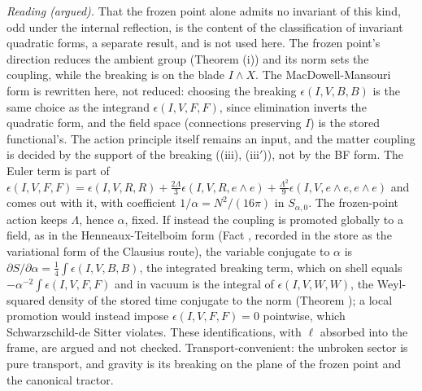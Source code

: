\emph{Reading (argued).} That the frozen point alone admits no invariant of this kind, odd under the internal reflection, is the content of the classification of invariant quadratic forms, a separate result, and is not used here. The frozen point's direction reduces the ambient group (Theorem (i)) and its norm sets the coupling, while the breaking is on the blade $I \wedge X$. The MacDowell-Mansouri form is rewritten here, not reduced: choosing the breaking $\epsilon(I, V, B, B)$ is the same choice as the integrand $\epsilon(I, V, F, F)$, since elimination inverts the quadratic form, and the field space (connections preserving $I$) is the stored functional's. The action principle itself remains an input, and the matter coupling is decided by the support of the breaking ((iii), (iii$'$)), not by the BF form. The Euler term is part of $\epsilon(I, V, F, F) = \epsilon(I, V, R, R) + \tfrac{2\Lambda}{3}\epsilon(I, V, R, e\wedge e) + \tfrac{\Lambda^{2}}{9}\epsilon(I, V, e\wedge e, e\wedge e)$ and comes out with it, with coefficient $1/\alpha = N^{2}/(16\pi)$ in $S_{\alpha, 0}$. The frozen-point action keeps $\Lambda$, hence $\alpha$, fixed. If instead the coupling is promoted globally to a field, as in the Henneaux-Teitelboim form (Fact , recorded in the store as the variational form of the Clausius route), the variable conjugate to $\alpha$ is $\partial S/\partial\alpha = \tfrac14\int\epsilon(I, V, B, B)$, the integrated breaking term, which on shell equals $-\alpha^{-2}\int\epsilon(I, V, F, F)$ and in vacuum is the integral of $\epsilon(I, V, W, W)$, the Weyl-squared density of the stored time conjugate to the norm (Theorem ); a local promotion would instead impose $\epsilon(I, V, F, F) = 0$ pointwise, which Schwarzschild-de Sitter violates. These identifications, with $\ell$ absorbed into the frame, are argued and not checked. Transport-convenient: the unbroken sector is pure transport, and gravity is its breaking on the plane of the frozen point and the canonical tractor.
